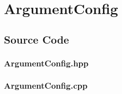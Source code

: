 \section{ArgumentConfig}
\label{sec:lArgumentConfig}


\subsection{Source Code}
\subsubsection{ArgumentConfig.hpp}
\pagebreak
\subsubsection{ArgumentConfig.cpp}
\pagebreak
